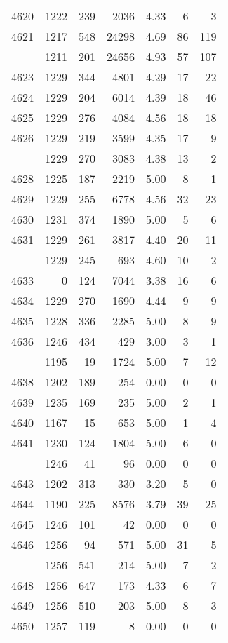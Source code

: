 \documentclass[
]{article}
\begin{document}
\begin{table}
\begin{tabular}[t]{lrrrrrr}
4620 & 1222 & 239 & 2036 & 4.33 & 6 & 3\\
4621 & 1217 & 548 & 24298 & 4.69 & 86 & 119\\
\addlinespace
4622 & 1211 & 201 & 24656 & 4.93 & 57 & 107\\
4623 & 1229 & 344 & 4801 & 4.29 & 17 & 22\\
4624 & 1229 & 204 & 6014 & 4.39 & 18 & 46\\
4625 & 1229 & 276 & 4084 & 4.56 & 18 & 18\\
4626 & 1229 & 219 & 3599 & 4.35 & 17 & 9\\
\addlinespace
4627 & 1229 & 270 & 3083 & 4.38 & 13 & 2\\
4628 & 1225 & 187 & 2219 & 5.00 & 8 & 1\\
4629 & 1229 & 255 & 6778 & 4.56 & 32 & 23\\
4630 & 1231 & 374 & 1890 & 5.00 & 5 & 6\\
4631 & 1229 & 261 & 3817 & 4.40 & 20 & 11\\
\addlinespace
4632 & 1229 & 245 & 693 & 4.60 & 10 & 2\\
4633 & 0 & 124 & 7044 & 3.38 & 16 & 6\\
4634 & 1229 & 270 & 1690 & 4.44 & 9 & 9\\
4635 & 1228 & 336 & 2285 & 5.00 & 8 & 9\\
4636 & 1246 & 434 & 429 & 3.00 & 3 & 1\\
\addlinespace
4637 & 1195 & 19 & 1724 & 5.00 & 7 & 12\\
4638 & 1202 & 189 & 254 & 0.00 & 0 & 0\\
4639 & 1235 & 169 & 235 & 5.00 & 2 & 1\\
4640 & 1167 & 15 & 653 & 5.00 & 1 & 4\\
4641 & 1230 & 124 & 1804 & 5.00 & 6 & 0\\
\addlinespace
4642 & 1246 & 41 & 96 & 0.00 & 0 & 0\\
4643 & 1202 & 313 & 330 & 3.20 & 5 & 0\\
4644 & 1190 & 225 & 8576 & 3.79 & 39 & 25\\
4645 & 1246 & 101 & 42 & 0.00 & 0 & 0\\
4646 & 1256 & 94 & 571 & 5.00 & 31 & 5\\
\addlinespace
4647 & 1256 & 541 & 214 & 5.00 & 7 & 2\\
4648 & 1256 & 647 & 173 & 4.33 & 6 & 7\\
4649 & 1256 & 510 & 203 & 5.00 & 8 & 3\\
4650 & 1257 & 119 & 8 & 0.00 & 0 & 0\\

\end{tabular}
\end{table}
\end{document}
